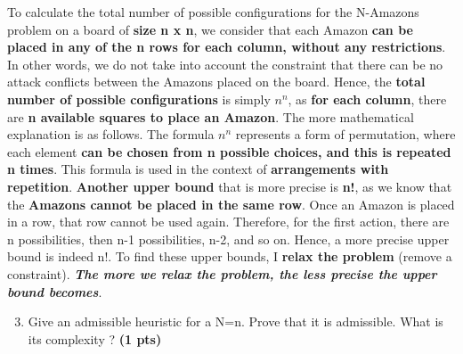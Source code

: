 \documentclass[11pt,a4paper]{report}
\begin{document}
\begin{answers}[5cm]
\small{To calculate the total number of possible configurations for the N-Amazons problem on a board of \textbf{size n x n}, we consider that each Amazon \textbf{can be placed in any of the n rows for each column, without any restrictions}. In other words, we do not take into account the constraint that there can be no attack conflicts between the Amazons placed on the board.
Hence, the \textbf{total number of possible configurations} is simply \textbf{$n^n$}, as \textbf{for each column}, there are \textbf{n available squares to place an Amazon}. The more mathematical explanation is as follows. The formula $n^n$ represents a form of permutation, where each element \textbf{can be chosen from n possible choices, and this is repeated n times}. This formula is used in the context of \textbf{arrangements with repetition}. \textbf{Another upper bound} that is more precise is \textbf{n!}, as we know that the \textbf{Amazons cannot be placed in the same row}. Once an Amazon is placed in a row, that row cannot be used again. Therefore, for the first action, there are n possibilities, then n-1 possibilities, n-2, and so on. Hence, a more precise upper bound is indeed n!. To find these upper bounds, I \textbf{relax the problem} (remove a constraint). \textbf{\textit{The more we relax the problem, the less precise the upper bound becomes}}.}

\end{answers}



\begin{enumerate}
\setcounter{enumi}{2}
\item Give an admissible heuristic for a N=n. Prove that it is admissible. What is its complexity ? \textbf{(1 pts)}
\end{enumerate}
\end{document}
